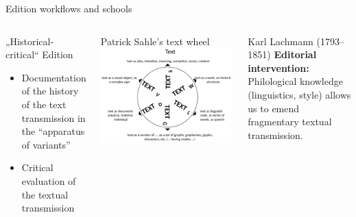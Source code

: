 \begin{frame}[allowframebreaks]{Edition workflows and schools}
\begin{columns}
\begin{block}{„Historical-critical“ Edition}
\begin{itemize}
\item  Documentation of the history of the text
transmission in the “apparatus of variants”
\item  Critical evaluation of the textual transmission
\end{itemize}
\end{block}

\begin{block}{Patrick Sahle's text wheel}
\includegraphics[width=\textwidth]{img/sahle-text-wheel.png}
\end{block}

\begin{block}{Karl Lachmann (1793--1851)}
\textbf{Editorial intervention:} Philological knowledge (linguistics, style) allows us to emend fragmentary textual transmission.
\end{block}
\end{columns}

\framebreak


\end{frame}
